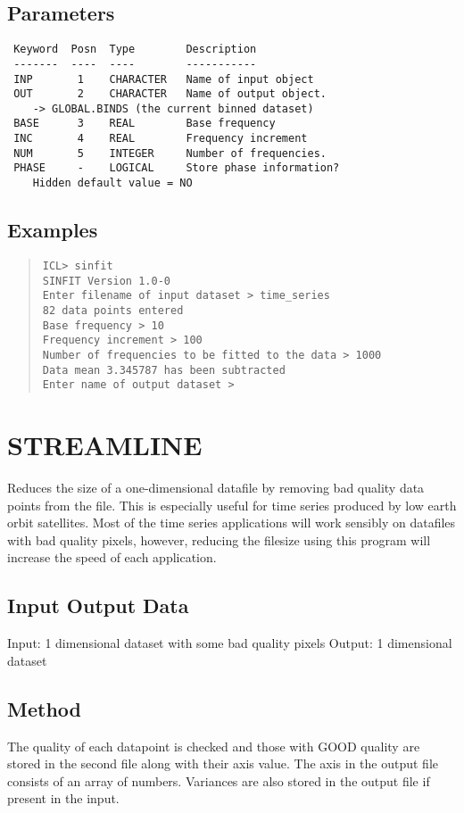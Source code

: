 \documentclass{book}
\renewcommand{\_}{{\tt\char'137}}     %
\begin{document}
\subsection{Parameters}
\begin{verbatim}
 Keyword  Posn  Type        Description
 -------  ----  ----        -----------
 INP       1    CHARACTER   Name of input object
 OUT       2    CHARACTER   Name of output object.
    -> GLOBAL.BINDS (the current binned dataset)
 BASE      3    REAL        Base frequency
 INC       4    REAL        Frequency increment
 NUM       5    INTEGER     Number of frequencies.
 PHASE     -    LOGICAL     Store phase information?
    Hidden default value = NO

\end{verbatim}\subsection{Examples}
\begin{quote}\begin{verbatim}
ICL> sinfit
SINFIT Version 1.0-0
Enter filename of input dataset > time_series
82 data points entered
Base frequency > 10
Frequency increment > 100
Number of frequencies to be fitted to the data > 1000
Data mean 3.345787 has been subtracted
Enter name of output dataset >
\end{verbatim}\end{quote}
\section{STREAMLINE}
Reduces the size of a one-dimensional datafile by removing
bad quality data points from the file. This is especially useful
for time series produced by low earth orbit satellites. Most
of the time series applications will work sensibly on datafiles with
bad quality pixels, however, reducing the filesize using this
program will increase the speed of each application.

\subsection{Input Output Data}
Input: 1 dimensional dataset with some bad quality pixels
Output: 1 dimensional dataset
\subsection{Method}
The quality of each datapoint is checked and those with GOOD
quality are stored in the second file along with their axis
value. The axis in the output file consists of an array of numbers.
Variances are also stored in the output file if present in the
input.
\end{document}
